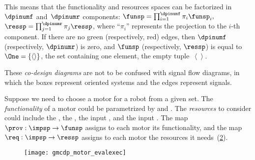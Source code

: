 \begin{figure}[h]
    \centering
    \caption{\label{fig:dp_graphical}}
\end{figure}


This means that the functionality and resources spaces can be factorized in~$\dpinumf$ and~$\dpinumr$ components: $\funsp=\prod_{i=1}^{\dpinumf}\pi_{i}\funsp_{i},$
$\ressp=\prod_{j=1}^{\dpinumr}\pi_{j}\ressp$, where ``$\pi_{i}$''
represents the projection to the $i$-th component. If there are no
green (respectively, red) edges, then $\dpinumf$ (respectively, $\dpinumr$)
is zero, and $\funsp$ (respectively, $\ressp$) is equal to~$\One=\{\left\langle \right\rangle \}$,
the set containing one element, the empty tuple~$\left\langle \right\rangle $.

These \emph{co-design diagrams} are not to be confused with signal
flow diagrams, in which the boxes represent oriented systems and the
edges represent signals.


\begin{example}
    \label{exa:motor}Suppose we need to choose a motor for a robot from
    a given set. The \emph{functionality} of a motor could be parametrized
    by  and . The \emph{resources} to consider
    could include the , the , the
    input , and the input .
    The map~$\prov:\impsp\rightarrow\funsp$ assigns to each motor its
    functionality, and the map~$\req:\impsp\rightarrow\ressp$ assigns
    to each motor the resources it needs~(\cref{fig:motor_evalexec}).
\end{example}

\begin{figure}[h]
    \centering
    \texttt{[image: gmcdp\_motor\_evalexec]}
    \caption{}
    \label{fig:motor_evalexec}
\end{figure}



